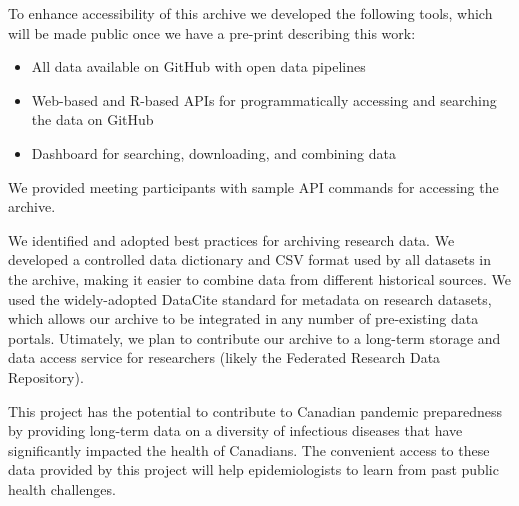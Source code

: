To enhance accessibility of this archive we developed the following tools, which will be made public once we have a pre-print describing this work:

\begin{itemize}
  \item All data available on GitHub with open data pipelines
  \item Web-based and R-based APIs for programmatically accessing and searching the data on GitHub
  \item Dashboard for searching, downloading, and combining data
\end{itemize}

We provided meeting participants with sample API commands for accessing the archive.

We identified and adopted best practices for archiving research data. We developed a controlled data dictionary and CSV format used by all datasets in the archive, making it easier to combine data from different historical sources. We used the widely-adopted DataCite standard for metadata on research datasets, which allows our archive to be integrated in any number of pre-existing data portals. Utimately, we plan to contribute our archive to a long-term storage and data access service for researchers (likely the Federated Research Data Repository).

This project has the potential to contribute to Canadian pandemic preparedness by providing long-term data on a diversity of infectious diseases that have significantly impacted the health of Canadians. The convenient access to these data provided by this project will help epidemiologists to learn from past public health challenges.